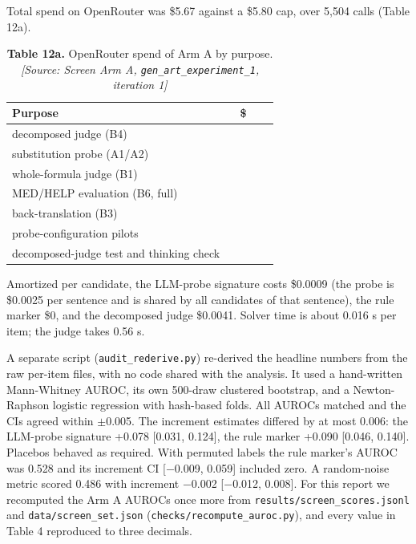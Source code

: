 \documentclass[11pt,letterpaper]{article}
\begin{document}
Total spend on OpenRouter was \$5.67 against a \$5.80 cap, over 5,504 calls (Table 12a).

\begin{table}[H]
\centering
\small
\setlength{\tabcolsep}{3pt}
\caption*{\textbf{Table 12a.} OpenRouter spend of Arm A by purpose. \textit{[Source: Screen Arm A, \texorpdfstring{\textup{\nolinkurl{gen_art_experiment_1}}}{gen art experiment 1}, iteration 1]}}
\begin{tabular}{>{\raggedright\arraybackslash}p{0.824\linewidth}>{\raggedright\arraybackslash}p{0.140\linewidth}}
\toprule
\textbf{Purpose} & \textbf{\$} \\
\midrule
{}decomposed judge (B4) & 4.719 \\
{}substitution probe (A1/A2) & 0.747 \\
{}whole-formula judge (B1) & 0.071 \\
{}MED/HELP evaluation (B6, full) & 0.051 \\
{}back-translation (B3) & 0.049 \\
{}probe-configuration pilots & 0.018 \\
{}decomposed-judge test and thinking check & 0.010 \\
\bottomrule
\end{tabular}
\end{table}

Amortized per candidate, the LLM-probe signature costs \$0.0009 (the probe is \$0.0025 per sentence and is shared by all candidates of that sentence), the rule marker \$0, and the decomposed judge \$0.0041. Solver time is about 0.016 s per item; the judge takes 0.56 s.

A separate script (\texttt{audit\_\allowbreak{}\allowbreak{}rederive.py}) re-derived the headline numbers from the raw per-item files, with no code shared with the analysis. It used a hand-written Mann-Whitney AUROC, its own 500-draw clustered bootstrap, and a Newton-Raphson logistic regression with hash-based folds. All AUROCs matched and the CIs agreed within $\pm$0.005. The increment estimates differed by at most 0.006: the LLM-probe signature +0.078 [0.031, 0.124], the rule marker +0.090 [0.046, 0.140]. Placebos behaved as required. With permuted labels the rule marker's AUROC was 0.528 and its increment CI [$-$0.009, 0.059] included zero. A random-noise metric scored 0.486 with increment $-$0.002 [$-$0.012, 0.008]. For this report we recomputed the Arm A AUROCs once more from \texttt{results/\allowbreak{}screen\_\allowbreak{}\allowbreak{}scores.jsonl} and \texttt{data/\allowbreak{}screen\_\allowbreak{}\allowbreak{}set.json} (\texttt{checks/\allowbreak{}recompute\_\allowbreak{}\allowbreak{}auroc.py}), and every value in Table 4 reproduced to three decimals.
\end{document}

